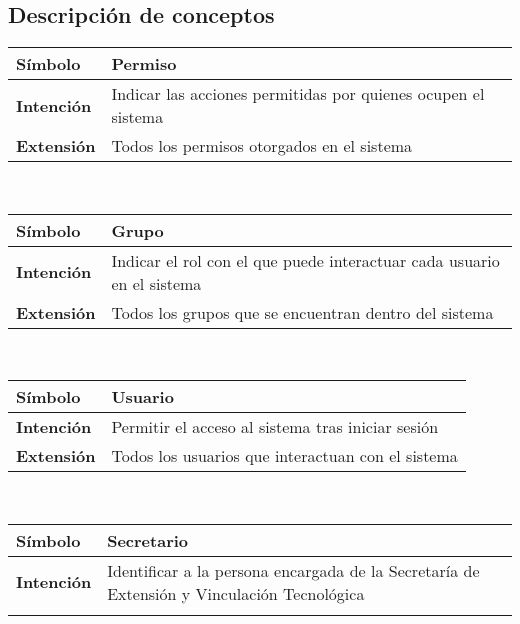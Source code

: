 \subsection[Descripci\'on]
	{Descripci\'on de conceptos}
\begin{center}
\hypertarget{permiso}{%
\begin{tabular}{ | p{2.5cm} | p{13cm} | }
	\hline
	\cellcolor{lightgray}
	\textbf{S\'imbolo} &
	Permiso \\
	\hline
	\cellcolor{lightgray}
	\textbf{Intenci\'on} &
	Indicar las acciones permitidas por quienes
	ocupen el sistema \\
	\hline
	\cellcolor{lightgray}
	\textbf{Extensi\'on} &
	Todos los permisos otorgados en el sistema \\
	\hline
\end{tabular}} \\[1cm]
\hypertarget{grupo}{%
\begin{tabular}{ | p{2.5cm} | p{13cm} | }
	\hline
	\cellcolor{lightgray}
	\textbf{S\'imbolo} &
	Grupo \\
	\hline
	\cellcolor{lightgray}
	\textbf{Intenci\'on} &
	Indicar el rol con el que puede interactuar
	cada usuario en el sistema \\
	\hline
	\cellcolor{lightgray}
	\textbf{Extensi\'on} &
	Todos los grupos que se encuentran dentro del
	sistema \\
	\hline
\end{tabular}} \\[1cm]
\hypertarget{usuario}{%
\begin{tabular}{ | p{2.5cm} | p{13cm} | }
	\hline
	\cellcolor{lightgray}
	\textbf{S\'imbolo} &
	Usuario \\
	\hline
	\cellcolor{lightgray}
	\textbf{Intenci\'on} &
	Permitir el acceso al sistema tras iniciar
	sesi\'on \\
	\hline
	\cellcolor{lightgray}
	\textbf{Extensi\'on} &
	Todos los usuarios que interactuan con el
	sistema \\
	\hline
\end{tabular}} \\[1cm]
\hypertarget{secretario}{%
\begin{tabular}{ | p{2.5cm} | p{13cm} | }
	\hline
	\cellcolor{lightgray}
	\textbf{S\'imbolo} &
	Secretario \\
	\hline
	\cellcolor{lightgray}
	\textbf{Intenci\'on} &
	Identificar a la persona encargada de la
	Secretar\'ia de Extensi\'on y Vinculaci\'on
	Tecnol\'ogica \\
	\hline
	\cellcolor{lightgray}

\end{tabular}}
\end{center}
